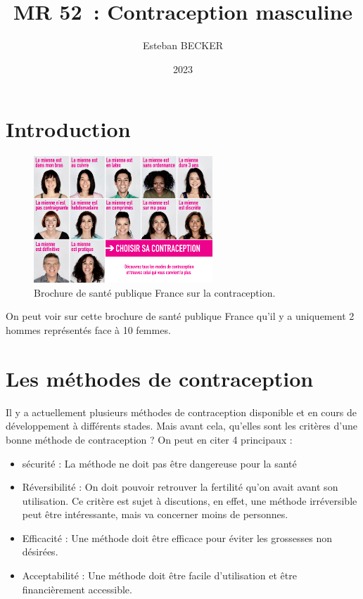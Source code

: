\documentclass[12pt,a4paper]{report}
\title{MR 52 : Contraception masculine}
\author{Esteban BECKER}
\date{2023}
\begin{document}
\maketitle
\tableofcontents
\chapter*{Introduction}

\begin{figure}[h]
    \centering
    \includegraphics[width=0.6\textwidth]{images/intro/choisir-sa-contraception.png}
    \caption{Brochure de santé publique France sur la contraception.}
    \label{fig:brochureSPF}
\end{figure}
On peut voir sur cette brochure de santé publique France qu'il y a uniquement 2 hommes représentés face à 10 femmes. \cite{santepublicfranceChoisirSaContraception2019}
\chapter{Les méthodes de contraception}

Il y a actuellement plusieurs méthodes de contraception disponible et en cours de développement à différents stades. Mais avant cela, qu'elles sont les critères d'une bonne méthode de contraception ?
On peut en citer 4 principaux :
\begin{itemize}
    \item sécurité : La méthode ne doit pas être dangereuse pour la santé
    \item Réversibilité : On doit pouvoir retrouver la fertilité qu'on avait avant son utilisation. Ce critère est sujet à discutions, en effet, une méthode irréversible peut être intéressante, mais va concerner moins de personnes.
    \item Efficacité : Une méthode doit être efficace pour éviter les grossesses non désirées.
    \item Acceptabilité : Une méthode doit être facile d'utilisation et être financièrement accessible. \cite{mieussetPotentialMildTesticular1994}
\end{itemize}
\end{document}
